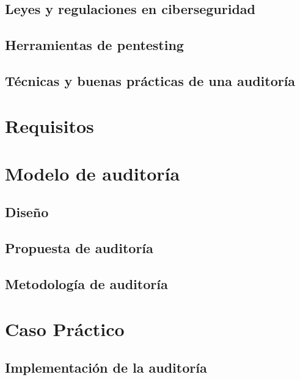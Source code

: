 \documentclass[a4paper, 10pt]{article}
\begin{document}
\subsection{Leyes y regulaciones en ciberseguridad}
\subsection{Herramientas de pentesting}
\subsection{Técnicas y buenas prácticas de una auditoría}

\clearpage

\section{Requisitos}

\clearpage

\section{Modelo de auditoría}

\subsection{Diseño}

\subsection{Propuesta de auditoría}

\subsection{Metodología de auditoría}

\clearpage


\section{Caso Práctico}

\subsection{Implementación de la auditoría}
\end{document}
